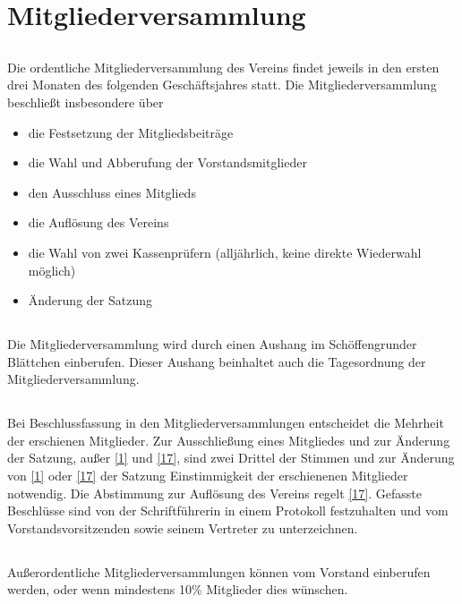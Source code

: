 \section{Mitgliederversammlung}
	\subsection{} Die ordentliche Mitgliederversammlung des Vereins findet jeweils in den ersten drei Monaten des folgenden Geschäftsjahres statt. Die Mitgliederversammlung beschließt insbesondere über
	
	\begin{itemize}
		\item die Festsetzung der Mitgliedsbeiträge 
		\item die Wahl und Abberufung der Vorstandsmitglieder
		\item den Ausschluss eines Mitglieds
		\item die Auflösung des Vereins
		\item die Wahl von zwei Kassenprüfern (alljährlich, keine direkte Wiederwahl möglich)
		\item Änderung der Satzung  
	\end{itemize} 

	
	\subsection{} Die Mitgliederversammlung wird durch einen Aushang im Schöffengrunder Blättchen einberufen. Dieser Aushang beinhaltet auch die Tagesordnung der Mitgliederversammlung.  
	
	\subsection{} Bei Beschlussfassung in den Mitgliederversammlungen entscheidet die Mehrheit der erschienen Mitglieder. Zur Ausschließung eines Mitgliedes und zur Änderung der Satzung, außer \ref{1} und \ref{17}, sind zwei Drittel der Stimmen und zur Änderung von \ref{1} oder \ref{17} der Satzung Einstimmigkeit der erschienenen Mitglieder notwendig. Die Abstimmung zur Auflösung des Vereins regelt \ref{17}. Gefasste Beschlüsse sind von der Schriftführerin in einem Protokoll festzuhalten und vom Vorstandsvorsitzenden sowie seinem Vertreter zu unterzeichnen.  
	
	\subsection{} Außerordentliche Mitgliederversammlungen können vom Vorstand einberufen werden, oder wenn mindestens 10\% Mitglieder dies wünschen. 
	
